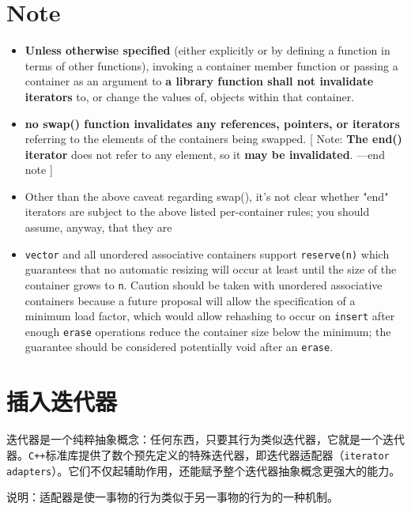 \documentclass[UTF8,a4paper,12pt]{ctexbook}
\begin{document}
	\section{Note}
		\begin{itemize}
			\item \textbf{Unless otherwise specified} (either explicitly or by defining a function in terms of other functions), invoking a container member function or passing a container as an argument to \textbf{a library function shall not invalidate iterators }to, or change the values of, objects within that container.
			\item \textbf{no swap() function invalidates any references, pointers, or iterators} referring to the elements of the containers being swapped. [ Note: \textbf{The end() iterator} does not refer to any element, so it \textbf{may be invalidated}. —end note ]
			\item Other than the above caveat regarding swap(), it's not clear whether "end" iterators are subject to the above listed per-container rules; you should assume, anyway, that they are
			\item \verb|vector| and all unordered associative containers support \verb|reserve(n)| which guarantees that no automatic resizing will occur at least until the size of the container grows to \verb|n|. Caution should be taken with unordered associative containers because a future proposal will allow the specification of a minimum load factor, which would allow rehashing to occur on \verb|insert| after enough \verb|erase| operations reduce the container size below the minimum; the guarantee should be considered potentially void after an \verb|erase|.
		\end{itemize}
		
	\section{插入迭代器}
		迭代器是一个纯粹抽象概念：任何东西，只要其行为类似迭代器，它就是一个迭代器。\verb|C++|标准库提供了数个预先定义的特殊迭代器，即迭代器适配器（\verb|iterator adapters|）。它们不仅起辅助作用，还能赋予整个迭代器抽象概念更强大的能力。
		
		说明：适配器是使一事物的行为类似于另一事物的行为的一种机制。
		
\end{document}
